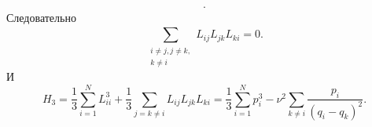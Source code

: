 \documentclass[a4paper]{article}
\begin{document}
\begin{sol}
\begin{multline*}
.\end{multline*} 
Следовательно
\[
\sum_{\substack{i\neq j, j\neq k,\\ k\neq i}}^{} L_{ij}L_{jk}L_{ki}=0
.\] 
И
\[
H_3= \frac{1}{3} \sum_{i=1}^{N} L_{ii}^3+ \frac{1}{3}
\sum_{j=k\neq i}^{} L_{ij}L_{jk}L_{ki}=
\frac{1}{3}\sum_{i=1}^{N} p_i^3-
\nu^2 \sum_{k \neq i}^{} \frac{p_i}{(q_i-q_k)^2}
.\] 

\end{sol}
\begin{hiProb}[Упражнение 1.3]
\end{hiProb}
\end{document}
